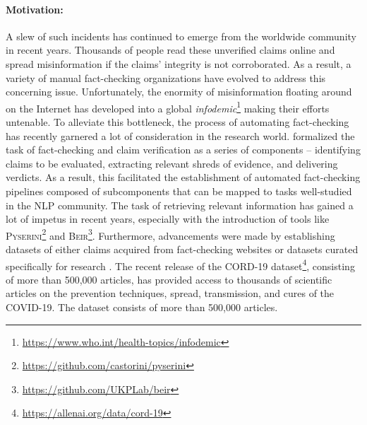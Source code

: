 \documentclass[11pt]{article}
\begin{document}
\paragraph{Motivation:}
A slew of such incidents has continued to emerge from the worldwide community in recent years. Thousands of people read these unverified claims online and spread misinformation if the claims' integrity is not corroborated. As a result, a variety of manual fact-checking organizations have evolved to address this concerning issue. Unfortunately, the enormity of misinformation floating around on the Internet has developed into a global \textit{infodemic}\footnote{\url{https://www.who.int/health-topics/infodemic}} making their efforts untenable. To alleviate this bottleneck, the process of automating fact-checking has recently garnered a lot of consideration in the research world. \citet{vlachos-riedel-2014-fact} formalized the task of fact-checking and claim verification as a series of components – identifying claims to be evaluated, extracting relevant shreds of evidence, and delivering verdicts. As a result, this facilitated the establishment of automated fact-checking pipelines composed of subcomponents that can be mapped to tasks well-studied in the NLP community. The task of retrieving relevant information has gained a lot of impetus in recent years, especially with the introduction of tools like \textsc{Pyserini}\footnote{\url{https://github.com/castorini/pyserini}} and \textsc{Beir}\footnote{\url{https://github.com/UKPLab/beir}}. Furthermore, advancements were made by establishing datasets of either claims acquired from fact-checking websites \cite{wang-2017-liar} or datasets curated specifically for research \cite{thorne2018fever}. The recent release of the CORD-19 dataset\footnote{\url{https://allenai.org/data/cord-19}}, consisting of more than 500,000 articles, has provided access to thousands of scientific articles on the prevention techniques, spread, transmission, and cures of the COVID-19. The dataset consists of more than 500,000 articles. \\
\end{document}
